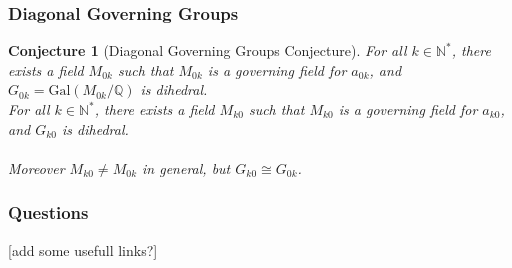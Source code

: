 \documentclass[12pt]{beamer}
\newtheorem*{conjecture}{Conjecture}
\begin{document}
	\begin{frame}
		\frametitle{Diagonal Governing Groups}
		\begin{conjecture}[Diagonal Governing Groups Conjecture]
			For all $k \in \mathbb{N}^*$, there exists a field $M_{0k}$ such that $M_{0k}$ is a governing field for $a_{0k}$, and $G_{0k} = \text{Gal}(M_{0k}/\mathbb{Q})$ is dihedral.\\
			For all $k \in \mathbb{N}^*$, there exists a field $M_{k0}$ such that $M_{k0}$ is a governing field for $a_{k0}$, and $G_{k0}$ is dihedral.\\
			\ \\
			Moreover $M_{k0} \neq M_{0k}$ in general, but $G_{k0} \cong G_{0k}$.
		\end{conjecture}
	\end{frame}

	\begin{frame}
		\frametitle{Questions}
		[add some usefull links?]
	\end{frame}
	
\end{document}
